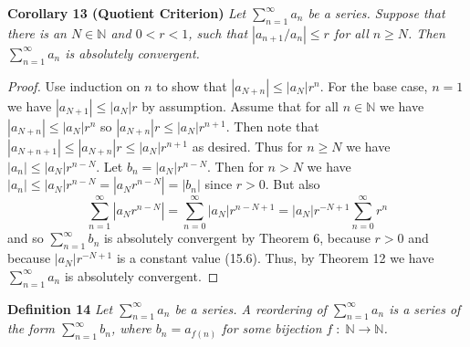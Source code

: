 \documentclass{article}
\begin{document}
\begin{flushleft}
\textbf{Corollary 13 (Quotient Criterion)}
\textsl{Let $\sum_{n=1}^{\infty} a_n$ be a series. Suppose that there is an $N \in \mathbb{N}$ and $0<r<1$, such that $|a_{n+1}/a_n| \leq r$ for all $n \geq N$. Then $\sum_{n=1}^{\infty} a_n$ is absolutely convergent.}
\begin{proof}
Use induction on $n$ to show that $|a_{N+n}| \leq |a_N| r^n$. For the base case, $n=1$ we have $|a_{N+1}| \leq |a_N| r$ by assumption. Assume that for all $n \in \mathbb{N}$ we have $|a_{N+n}| \leq |a_N| r^n$ so $|a_{N+n}| r \leq |a_N| r^{n+1}$. Then note that $|a_{N+n+1}| \leq |a_{N+n}| r \leq |a_N| r^{n+1}$ as desired. Thus for $n \geq N$ we have $|a_n| \leq |a_N| r^{n-N}$. Let $b_n = |a_N| r^{n-N}$. Then for $n>N$ we have $|a_n| \leq |a_N| r^{n-N} = |a_N r^{n-N}| = |b_n|$ since $r>0$. But also
\[
\sum_{n=1}^{\infty} |a_N r^{n-N} | = \sum_{n=0}^{\infty} |a_N| r^{n-N+1} = |a_N| r^{-N+1} \sum_{n=0}^{\infty} r^n
\]
and so $\sum_{n=1}^{\infty} b_n$ is absolutely convergent by Theorem 6, because $r>0$ and because $|a_N| r^{-N+1}$ is a constant value (15.6). Thus, by Theorem 12 we have $\sum_{n=1}^{\infty} a_n$ is absolutely convergent.
\end{proof}

\textbf{Definition 14}
\textsl{Let $\sum_{n=1}^{\infty} a_n$ be a series. A reordering of $\sum_{n=1}^{\infty} a_n$ is a series of the form $\sum_{n=1}^{\infty} b_n$, where $b_n=a_{f(n)}$ for some bijection $f \; : \; \mathbb{N} \rightarrow \mathbb{N}$.}\newline


\end{flushleft}
\end{document}
